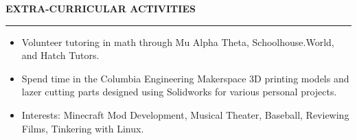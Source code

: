 \documentclass[10pt,letterpaper]{article}
\begin{document}
\medskip
\MakeUppercase{{\bf Extra-Curricular Activities}} %
\medskip
\hrule %
\begin{list}{}{\setlength{\leftmargin}{0em}}
\item
\begin{itemize}
    \item Volunteer tutoring in math through Mu Alpha Theta, Schoolhouse.World, and Hatch Tutors.
    \item Spend time in the Columbia Engineering Makerspace 3D printing models and lazer cutting parts designed using Solidworks for various personal projects.
    \item Interests: Minecraft Mod Development, Musical Theater, Baseball, Reviewing Films, Tinkering with Linux.
\end{itemize}
\end{list}


\end{document}
